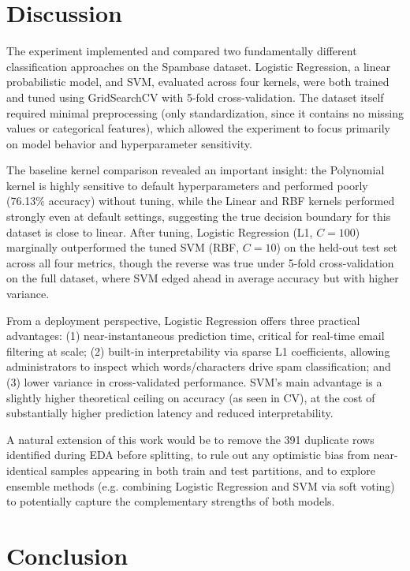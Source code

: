 \documentclass[12pt,a4paper]{article}
\begin{document}
\section{Discussion}

The experiment implemented and compared two fundamentally different classification approaches on the Spambase dataset. Logistic Regression, a linear probabilistic model, and SVM, evaluated across four kernels, were both trained and tuned using GridSearchCV with 5-fold cross-validation. The dataset itself required minimal preprocessing (only standardization, since it contains no missing values or categorical features), which allowed the experiment to focus primarily on model behavior and hyperparameter sensitivity.

The baseline kernel comparison revealed an important insight: the Polynomial kernel is highly sensitive to default hyperparameters and performed poorly (76.13\% accuracy) without tuning, while the Linear and RBF kernels performed strongly even at default settings, suggesting the true decision boundary for this dataset is close to linear. After tuning, Logistic Regression (L1, $C=100$) marginally outperformed the tuned SVM (RBF, $C=10$) on the held-out test set across all four metrics, though the reverse was true under 5-fold cross-validation on the full dataset, where SVM edged ahead in average accuracy but with higher variance.

From a deployment perspective, Logistic Regression offers three practical advantages: (1) near-instantaneous prediction time, critical for real-time email filtering at scale; (2) built-in interpretability via sparse L1 coefficients, allowing administrators to inspect which words/characters drive spam classification; and (3) lower variance in cross-validated performance. SVM's main advantage is a slightly higher theoretical ceiling on accuracy (as seen in CV), at the cost of substantially higher prediction latency and reduced interpretability.

A natural extension of this work would be to remove the 391 duplicate rows identified during EDA before splitting, to rule out any optimistic bias from near-identical samples appearing in both train and test partitions, and to explore ensemble methods (e.g. combining Logistic Regression and SVM via soft voting) to potentially capture the complementary strengths of both models.

\section{Conclusion}
\end{document}
